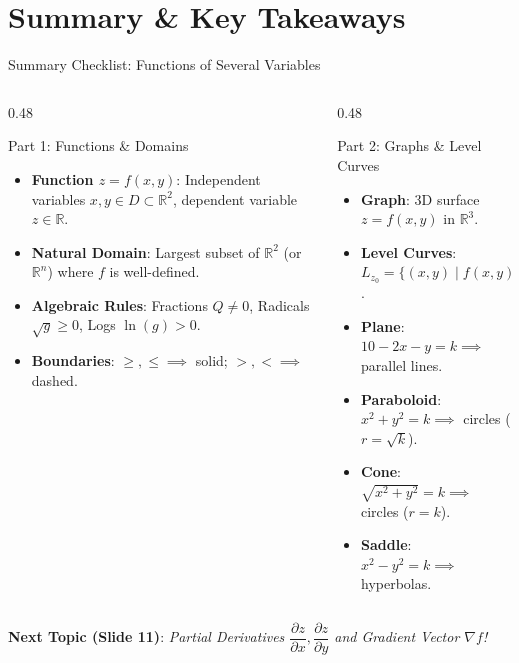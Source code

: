 \documentclass[aspectratio=169,10pt]{beamer}
\begin{document}
\section{Summary \& Key Takeaways}

\begin{frame}{Summary Checklist: Functions of Several Variables}
  \begin{columns}[T]
    \begin{column}{0.48\textwidth}
      \begin{block}{Part 1: Functions \& Domains}
        \small
        \begin{itemize}
          \item \textbf{Function $z = f(x, y)$}: Independent variables $x, y \in D \subset \mathbb{R}^2$, dependent variable $z \in \mathbb{R}$.
          \item \textbf{Natural Domain}: Largest subset of $\mathbb{R}^2$ (or $\mathbb{R}^n$) where $f$ is well-defined.
          \item \textbf{Algebraic Rules}: Fractions $Q \neq 0$, Radicals $\sqrt{g} \ge 0$, Logs $\ln(g) > 0$.
          \item \textbf{Boundaries}: $\ge, \le \implies$ solid; $>, < \implies$ dashed.
        \end{itemize}
      \end{block}
    \end{column}

    \begin{column}{0.48\textwidth}
      \begin{block}{Part 2: Graphs \& Level Curves}
        \small
        \begin{itemize}
          \item \textbf{Graph}: 3D surface $z = f(x, y)$ in $\mathbb{R}^3$.
          \item \textbf{Level Curves}: $L_{z_0} = \{(x, y) \mid f(x, y) = z_0\}$.
          \item \textbf{Plane}: $10-2x-y = k \implies$ parallel lines.
          \item \textbf{Paraboloid}: $x^2+y^2 = k \implies$ circles ($r=\sqrt{k}$).
          \item \textbf{Cone}: $\sqrt{x^2+y^2} = k \implies$ circles ($r=k$).
          \item \textbf{Saddle}: $x^2-y^2 = k \implies$ hyperbolas.
        \end{itemize}
      \end{block}
    \end{column}
  \end{columns}

  \vspace{0.6em}
  \centering
  \textbf{Next Topic (Slide 11)}: \textit{Partial Derivatives $\dfrac{\partial z}{\partial x}, \dfrac{\partial z}{\partial y}$ and Gradient Vector $\nabla f$!}
\end{frame}
\end{document}

